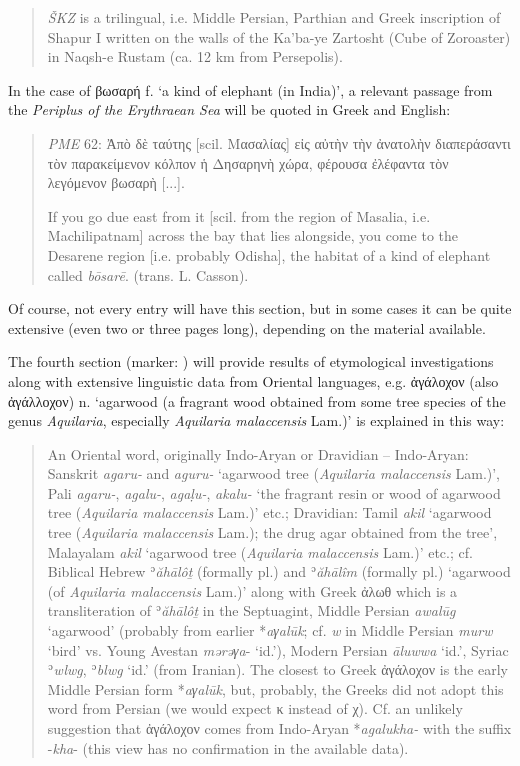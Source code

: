 \documentclass[output=paper,colorlinks,citecolor=brown,arabicfont,chinesefont]{langscibook}
\begin{document}
\begin{quote}
     \emph{ŠKZ} is a trilingual, i.e. Middle Persian, Parthian and Greek inscription of Shapur I written on the walls of the Ka’ba-ye Zartosht (Cube of Zoroaster) in Naqsh-e Rustam (ca. 12 km from Persepolis).
\end{quote}

In the case of βωσαρή f. ‘a kind of elephant (in India)’, a relevant passage from the \emph{Periplus of the Erythraean Sea} will be quoted in Greek and English:

\begin{quote}
    \sloppy
     \emph{PME} 62: Ἀπὸ δὲ ταύτης [scil. Μασαλίας] εἰς αὐτὴν τὴν ἀνατολὴν διαπεράσαντι τὸν παρακείμενον κόλπον ἡ Δησαρηνὴ χώρα, φέρουσα ἐλέφαντα τὸν λεγόμενον βωσαρὴ [...].
    
    If you go due east from it [scil. from the region of Masalia, i.e. Machilipatnam] across the bay that lies alongside, you come to the Desarene region [i.e. probably Odisha], the habitat of a kind of elephant called \emph{bōsarē}. (trans. L. Casson).
\end{quote}

Of course, not every entry will have this section, but in some cases it can be quite extensive (even two or three pages long), depending on the material available.

The fourth section (marker: ) will provide results of etymological investigations along with extensive linguistic data from Oriental languages, e.g. ἀγάλοχον (also ἀγάλλοχον) n. ‘agarwood (a fragrant wood obtained from some tree species of the genus \emph{Aquilaria}, especially \emph{Aquilaria malaccensis} Lam.)’ is explained in this way: 

\begin{quote}
     An Oriental word, originally Indo-Aryan or Dravidian – Indo-Aryan: Sanskrit \emph{agaru-} and \emph{aguru-} ‘agarwood tree (\emph{Aquilaria malaccensis} Lam.)’, Pali \emph{agaru-}, \emph{agalu-}, \emph{agaḷu-}, \emph{akalu-} ‘the fragrant resin or wood of agarwood tree (\emph{Aquilaria malaccensis} Lam.)’ etc.; Dravidian: Tamil \emph{akil} ‘agarwood tree (\emph{Aquilaria malaccensis} Lam.); the drug agar obtained from the tree’, Malayalam \emph{akil} ‘agarwood tree (\emph{Aquilaria malaccensis} Lam.)’ etc.; cf. Biblical Hebrew ʾ\emph{ăhālôṯ} (formally pl.) and ʾ\emph{ăhālîm} (formally pl.) ‘agarwood (of \emph{Aquilaria malaccensis} Lam.)’ along with Greek ἀλωθ which is a transliteration of ʾ\emph{ăhālôṯ} in the Septuagint, Middle Persian \emph{awalūg} ‘agarwood’ (probably from earlier *\emph{aγalūk}; cf. \emph{w} in Middle Persian \emph{murw} ‘bird’ vs. Young Avestan \emph{mərəγa}- ‘id.’), Modern Persian \emph{āluwwa} ‘id.’, Syriac ʾ\emph{wlwg}, ʾ\emph{blwg} ‘id.’ (from Iranian). The closest to Greek ἀγάλοχον is the early Middle Persian form *\emph{aγalūk}, but, probably, the Greeks did not adopt this word from Persian (we would expect κ instead of χ). Cf. an unlikely suggestion that ἀγάλοχον comes from Indo-Aryan *\emph{agalukha-} with the suffix -\emph{kha}- (this view has no confirmation in the available data).
\end{quote}
\end{document}
